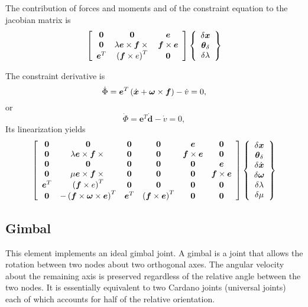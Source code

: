\documentclass[10pt,dvips,fleqn]{report}
\newcommand{\T}[1]{\boldsymbol{#1}}
\begin{document}
The contribution of forces and moments and of the constraint equation 
to the jacobian matrix is
\begin{equation}
	\sqbr{\matr{ccc}{
		\T{0} & \T{0} & \T{e} \\
		\T{0} & \lambda \T{e}\times\T{f}\times{} & \T{f}\times\T{e} \\
		\T{e}^T & \plbr{\T{f}\times{e}}^T & \T{0}
	}}\cubr{\cvvect{
		\delta\T{x} \\
		\T{\theta}_{\delta} \\
		\delta\lambda
	}}
\end{equation}

The constraint derivative is
\begin{equation}
	\dot{\Phi} = \T{e}^T \plbr{\dot{\T{x}} + \T{\omega}\times\T{f}} - \dot{v} = 0 ,
\end{equation}
or
\begin{equation}
	\dot{\Phi} = \T{e}^T \dot{\T{d}} - \dot{v} = 0 ,
\end{equation}
Its linearization yields
\begin{equation}
	\sqbr{\matr{cccccc}{
		\T{0} & \T{0} & \T{0} & \T{0} & \T{e} & \T{0} \\
		\T{0} & \lambda \T{e}\times\T{f}\times{} & 
			\T{0} & \T{0} & \T{f}\times\T{e} & \T{0} \\
		\T{0} & \T{0} & \T{0} & \T{0} & \T{0} & \T{e} \\
		\T{0} & \mu \T{e}\times\T{f}\times{} & 
			\T{0} & \T{0} & \T{0} & \T{f}\times\T{e} \\
		\T{e}^T & \plbr{\T{f}\times{e}}^T & 
			\T{0} & \T{0} & \T{0} & \T{0} \\
		\T{0} & - \plbr{\T{f}\times\T{\omega}\times\T{e}}^T &
			\T{e}^T & \plbr{\T{f}\times\T{e}}^T & \T{0} & \T{0}
	}}\cubr{\cvvect{
		\delta\T{x} \\
		\T{\theta}_{\delta} \\
		\delta\dot{\T{x}} \\
		\delta\T{\omega} \\
		\delta\lambda \\
		\delta\mu
	}}
\end{equation}













\subsection{Gimbal}
\label{sec:GimbalRotationJoint}
This element implements an ideal gimbal joint.
A gimbal is a joint that allows the rotation between two nodes
about two orthogonal axes.
The angular velocity about the remaining axis is preserved regardless
of the relative angle between the two nodes.
It is essentially equivalent to two Cardano joints (universal joints)
each of which accounts for half of the relative orientation.
\end{document}
